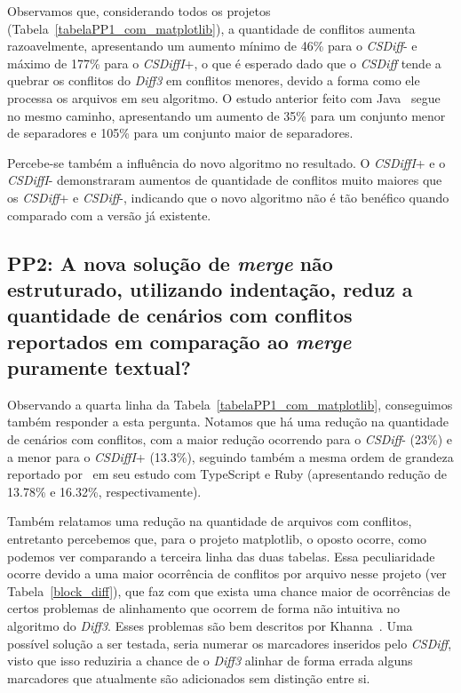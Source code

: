 Observamos que, considerando todos os projetos
(Tabela~\ref{tabelaPP1_com_matplotlib}), a quantidade de conflitos aumenta
razoavelmente, apresentando um aumento mínimo de 46\% para o \emph{CSDiff}- e
máximo de 177\% para o \emph{CSDiffI}+, o que é esperado dado que o
\emph{CSDiff} tende a quebrar os conflitos do \emph{Diff3} em conflitos
menores, devido a forma como ele processa os arquivos em seu algoritmo. O
estudo anterior feito com Java~\cite{clem21} segue no mesmo caminho,
apresentando um aumento de 35\% para um conjunto menor de separadores e 105\%
para um conjunto maior de separadores.

Percebe-se também a influência do novo algoritmo no resultado. O
\emph{CSDiffI}+ e o \emph{CSDiffI}- demonstraram aumentos de quantidade de
conflitos muito maiores que os \emph{CSDiff}+ e \emph{CSDiff}-, indicando que o
novo algoritmo não é tão benéfico quando comparado com a versão já existente.

\subsection{PP2: A nova solução de \emph{merge} não estruturado, utilizando indentação,
	reduz a quantidade de cenários com conflitos reportados em comparação ao \emph{merge} puramente textual?}\label{resultado_pp2}

Observando a quarta linha da Tabela~\ref{tabelaPP1_com_matplotlib}, conseguimos
também responder a esta pergunta. Notamos que há uma redução na quantidade de
cenários com conflitos, com a maior redução ocorrendo para o \emph{CSDiff}-
(23\%) e a menor para o \emph{CSDiffI}+ (13.3\%), seguindo também a mesma ordem
de grandeza reportado por~\cite{heitor21} em seu estudo com TypeScript e Ruby
(apresentando redução de 13.78\% e 16.32\%, respectivamente).

Também relatamos uma redução na quantidade de arquivos com conflitos,
entretanto percebemos que, para o projeto matplotlib, o oposto ocorre, como
podemos ver comparando a terceira linha das duas tabelas. Essa peculiaridade
ocorre devido a uma maior ocorrência de conflitos por arquivo nesse projeto
(ver Tabela~\ref{block_diff}), que faz com que exista uma chance maior de
ocorrências de certos problemas de alinhamento que ocorrem de forma não
intuitiva no algoritmo do \emph{Diff3}. Esses problemas são bem descritos
por Khanna~\cite{khan07}. Uma possível solução a ser testada, seria numerar os
marcadores inseridos pelo \emph{CSDiff}, visto que isso reduziria a chance de o
\emph{Diff3} alinhar de forma errada alguns marcadores que atualmente são
adicionados sem distinção entre si.

